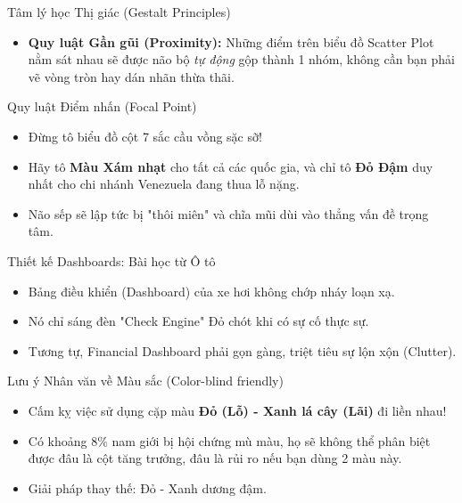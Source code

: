 \documentclass[aspectratio=169,12pt]{beamer}
\begin{document}
\begin{frame}{Tâm lý học Thị giác (Gestalt Principles)}
    \begin{itemize}
        \item \textbf{Quy luật Gần gũi (Proximity):} Những điểm trên biểu đồ Scatter Plot nằm sát nhau sẽ được não bộ \textit{tự động} gộp thành 1 nhóm, không cần bạn phải vẽ vòng tròn hay dán nhãn thừa thãi.
    \end{itemize}
\end{frame}

\begin{frame}{Quy luật Điểm nhấn (Focal Point)}
    \begin{itemize}
        \item Đừng tô biểu đồ cột 7 sắc cầu vồng sặc sỡ!
        \item Hãy tô \textbf{Màu Xám nhạt} cho tất cả các quốc gia, và chỉ tô \textbf{Đỏ Đậm} duy nhất cho chi nhánh Venezuela đang thua lỗ nặng.
        \item Não sếp sẽ lập tức bị "thôi miên" và chĩa mũi dùi vào thẳng vấn đề trọng tâm.
    \end{itemize}
\end{frame}

\begin{frame}{Thiết kế Dashboards: Bài học từ Ô tô}
    \begin{itemize}
        \item Bảng điều khiển (Dashboard) của xe hơi không chớp nháy loạn xạ.
        \item Nó chỉ sáng đèn "Check Engine" Đỏ chót khi có sự cố thực sự.
        \item Tương tự, Financial Dashboard phải gọn gàng, triệt tiêu sự lộn xộn (Clutter).
    \end{itemize}
\end{frame}

\begin{frame}{Lưu ý Nhân văn về Màu sắc (Color-blind friendly)}
    \begin{itemize}
        \item Cấm kỵ việc sử dụng cặp màu \textbf{Đỏ (Lỗ) - Xanh lá cây (Lãi)} đi liền nhau!
        \item Có khoảng 8\% nam giới bị hội chứng mù màu, họ sẽ không thể phân biệt được đâu là cột tăng trưởng, đâu là rủi ro nếu bạn dùng 2 màu này.
        \item Giải pháp thay thế: Đỏ - Xanh dương đậm.
    \end{itemize}
\end{frame}
\end{document}
